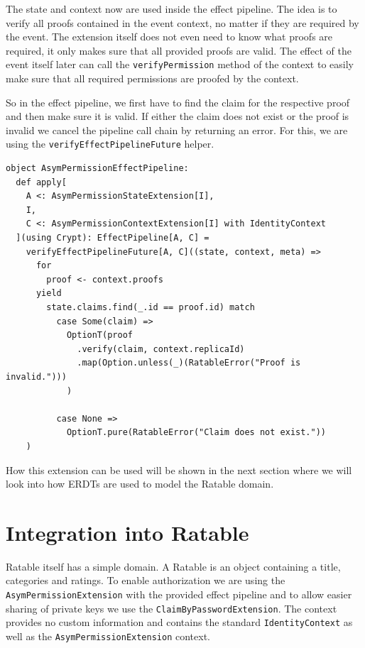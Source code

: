 \documentclass[
	english,
	ruledheaders=section,   %
	class=report,		    %
	thesis={type=bachelor}, %
	accentcolor=9c,			%
	custommargins=true,    %
	marginpar=false,        %
	parskip=half-,          %
	fontsize=11pt,          %
]{tudapub}
\begin{document}
The state and context now are used inside the effect pipeline. The idea is to verify all proofs contained in the event context, no matter if they are required by the event. The extension itself does not even need to know what proofs are required, it only makes sure that all provided proofs are valid. The effect of the event itself later can call the \texttt{verifyPermission} method of the context to easily make sure that all required permissions are proofed by the context.

So in the effect pipeline, we first have to find the claim for the respective proof and then make sure it is valid. If either the claim does not exist or the proof is invalid we cancel the pipeline call chain by returning an error. For this, we are using the \texttt{verifyEffectPipelineFuture} helper.

\begin{lstlisting}
object AsymPermissionEffectPipeline:
  def apply[
    A <: AsymPermissionStateExtension[I], 
    I, 
    C <: AsymPermissionContextExtension[I] with IdentityContext
  ](using Crypt): EffectPipeline[A, C] =
    verifyEffectPipelineFuture[A, C]((state, context, meta) =>
      for
        proof <- context.proofs
      yield
        state.claims.find(_.id == proof.id) match
          case Some(claim) => 
            OptionT(proof
              .verify(claim, context.replicaId)
              .map(Option.unless(_)(RatableError("Proof is invalid.")))
            )

          case None => 
            OptionT.pure(RatableError("Claim does not exist."))
    )
\end{lstlisting}

How this extension can be used will be shown in the next section where we will look into how ERDTs are used to model the Ratable domain.

\section{Integration into Ratable}
Ratable itself has a simple domain. A Ratable is an object containing a title, categories and ratings. To enable authorization we are using the \texttt{AsymPermissionExtension} with the provided effect pipeline and to allow easier sharing of private keys we use the \texttt{ClaimByPasswordExtension}. The context provides no custom information and contains the standard \texttt{IdentityContext} as well as the \texttt{AsymPermissionExtension} context.
\end{document}
